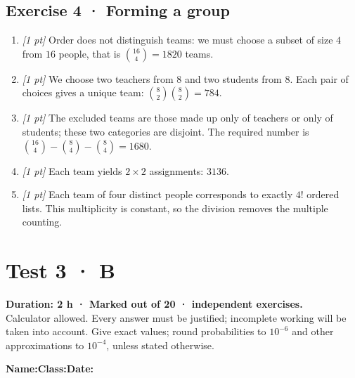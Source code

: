 \subsection*{Exercise 4 · Forming a group}\begin{enumerate}

\item \textit{[1 pt]} Order does not distinguish teams: we must choose a subset of size $4$ from $16$ people, that is $\binom{16}4=1820$ teams.

\item \textit{[1 pt]} We choose two teachers from $8$ and two students from $8$. Each pair of choices gives a unique team: $\binom{8}2\binom{8}2=784$.

\item \textit{[1 pt]} The excluded teams are those made up only of teachers or only of students; these two categories are disjoint. The required number is $\binom{16}4-\binom{8}4-\binom{8}4=1680$.

\item \textit{[1 pt]} Each team yields $2\times2$ assignments: $3136$.

\item \textit{[1 pt]} Each team of four distinct people corresponds to exactly $4!$ ordered lists. This multiplicity is constant, so the division removes the multiple counting.

\end{enumerate}

\fi

\fi

\ifmxteacher

\mxnewpage{}\label{sujet:4-4}

\section*{Test 3 · B}


\textbf{Duration: 2 h · Marked out of 20 ·  independent exercises.}\\Calculator allowed. Every answer must be justified; incomplete working will be taken into account. Give exact values; round probabilities to $10^{-6}$ and other approximations to $10^{-4}$, unless stated otherwise.

\smallskip\textbf{Name:}\enspace\dotfill\quad\textbf{Class:}\enspace\dotfill\quad\textbf{Date:}\enspace\dotfill

